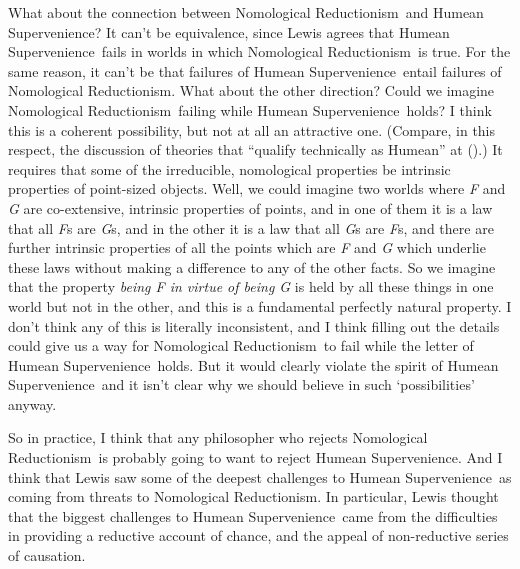 \documentclass[
  10pt,
  letterpaper,
  DIV=11,
  numbers=noendperiod,
  twoside]{scrartcl}
\begin{document}
What about the connection between Nomological Reductionism~and Humean
Supervenience? It can't be equivalence, since Lewis agrees that Humean
Supervenience~fails in worlds in which Nomological Reductionism~is true.
For the same reason, it can't be that failures of Humean
Supervenience~entail failures of Nomological Reductionism. What about
the other direction? Could we imagine Nomological Reductionism~failing
while Humean Supervenience~holds? I think this is a coherent
possibility, but not at all an attractive one. (Compare, in this
respect, the discussion of theories that ``qualify technically as
Humean'' at ().) It requires
that some of the irreducible, nomological properties be intrinsic
properties of point-sized objects. Well, we could imagine two worlds
where \emph{F} and \emph{G} are co-extensive, intrinsic properties of
points, and in one of them it is a law that all \emph{F}s are \emph{G}s,
and in the other it is a law that all \emph{G}s are \emph{F}s, and there
are further intrinsic properties of all the points which are \emph{F}
and \emph{G} which underlie these laws without making a difference to
any of the other facts. So we imagine that the property \emph{being F in
virtue of being G} is held by all these things in one world but not in
the other, and this is a fundamental perfectly natural property. I don't
think any of this is literally inconsistent, and I think filling out the
details could give us a way for Nomological Reductionism~to fail while
the letter of Humean Supervenience~holds. But it would clearly violate
the spirit of Humean Supervenience  and it isn't clear why we should
believe in such `possibilities' anyway.

So in practice, I think that any philosopher who rejects Nomological
Reductionism~is probably going to want to reject Humean Supervenience.
And I think that Lewis saw some of the deepest challenges to Humean
Supervenience~as coming from threats to Nomological Reductionism. In
particular, Lewis thought that the biggest challenges to Humean
Supervenience~came from the difficulties in providing a reductive
account of chance, and the appeal of non-reductive series of causation.
\end{document}
